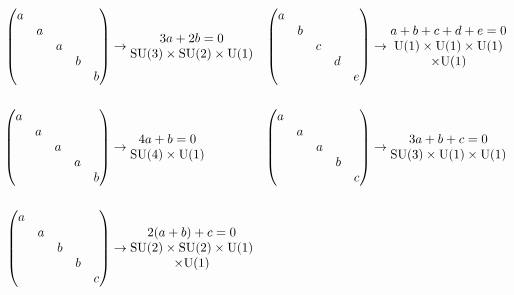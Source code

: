 \begin{align*}
    \begin{pmatrix} a & & & & \\ & a & & & \\ & & a & & \\ & & & b & \\ & & & & b \end{pmatrix} &\to \begin{matrix} 3a + 2b = 0 \\ \SU(3) \times \SU(2)\times\U(1) \end{matrix} 
    & \begin{pmatrix} a & & & & \\ & b & & & \\ & & c & & \\ & & & d & \\ & & & & e \end{pmatrix} &\to \begin{matrix} a+b+c+d+e = 0 \\ \U(1)\times \U(1)\times\U(1)\\\times\U(1) \end{matrix} \\[15pt]
    \begin{pmatrix} a & & & & \\ & a & & & \\ & & a & & \\ & & & a & \\ & & & & b \end{pmatrix} &\to \begin{matrix} 4a + b = 0 \\ \SU(4) \times \U(1) \end{matrix} 
    &\begin{pmatrix} a & & & & \\ & a & & & \\ & & a & & \\ & & & b & \\ & & & & c \end{pmatrix} &\to \begin{matrix} 3a + b + c = 0 \\ \SU(3) \times \U(1) \times \U(1) \end{matrix} \\[15pt]
    \begin{pmatrix} a & & & & \\ & a & & & \\ & & b & & \\ & & & b & \\ & & & & c \end{pmatrix} &\to \begin{matrix} 2(a + b) + c = 0 \\ \SU(2) \times \SU(2) \times \U(1)\\\times \U(1) \end{matrix} 

\end{align*}
